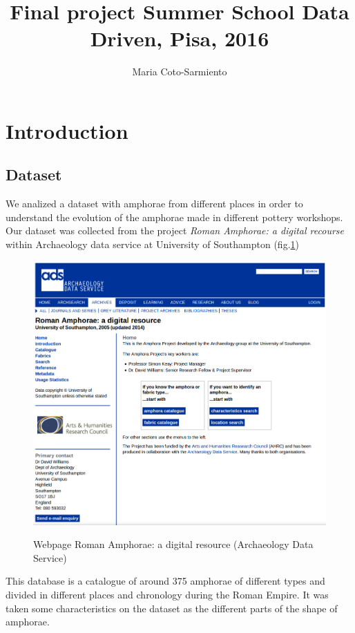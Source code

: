 \documentclass[10pt,a4paper]{article}
\author{Maria Coto-Sarmiento}
\title{Final project Summer School Data Driven, Pisa, 2016}
\begin{document}
\maketitle

\section{Introduction}


\subsection{Dataset}

We analized a dataset with amphorae from different places in order to understand the evolution of the amphorae made in different pottery workshops. Our dataset was collected from the project \emph{Roman Amphorae: a digital recourse} within Archaeology data service at University of Southampton (fig.\ref{picwebarch})

\begin{figure}[hdp]
	\centering
\includegraphics[scale=0.30]{picture1.png}
\label{picwebarch}
\caption{Webpage Roman Amphorae: a digital resource (Archaeology Data Service)}
\end{figure} 

This database is a catalogue of around 375 amphorae of different types and divided in different places and chronology during the Roman Empire. It was taken some characteristics on the dataset as the different parts of the shape of amphorae. 
\end{document}
